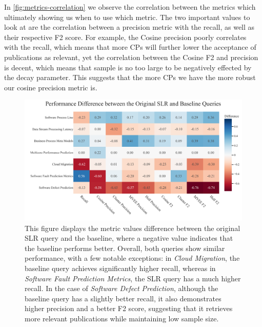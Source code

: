 In \autoref{fig:metrics-correlation} we observe the correlation between the metrics which ultimately showing us when to use which metric. The two important values to look at are the correlation between a precision metric with the recall, as well as their respective F2 score. For example, the Cosine precision poorly correlates with the recall, which means that more CPs will further lower the acceptance of publications as relevant, yet the correlation between the Cosine F2 and precision is decent, which means that sample is no too large to be negatively effected by the decay parameter. This suggests that the more CPs we have the more robust our cosine precision metric is.

\begin{figure}[!h]	
	\centering
	\includegraphics[scale=0.45]{pics/eval2_results.pdf}
	\caption[Evaluation Difference: Experiment 2]{This figure displays the metric values difference between the original SLR query and the baseline, where a negative value indicates that the baseline performs better. Overall, both queries show similar performance, with a few notable exceptions: in \textit{Cloud Migration}, the baseline query achieves significantly higher recall, whereas in \textit{Software Fault Prediction Metrics}, the SLR query has a much higher recall. In the case of \textit{Software Defect Prediction}, although the baseline query has a slightly better recall, it also demonstrates higher precision and a better F2 score, suggesting that it retrieves more relevant publications while maintaining low sample size.}
	\label{fig:eval2_results}
\end{figure}

